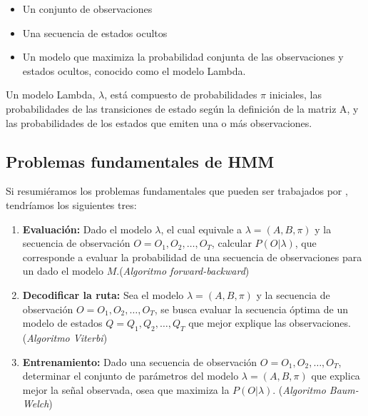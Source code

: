 \begin{itemize}
	\menorEspacioItemize
	\item Un conjunto de observaciones
	\item Una secuencia de estados ocultos
	\item Un modelo que maximiza la probabilidad conjunta de las observaciones y estados ocultos, conocido como el modelo Lambda.
\end{itemize}


Un modelo Lambda, $\lambda$, está compuesto de probabilidades $\pi$ iniciales, las probabilidades de las transiciones de estado según la definición de la matriz A, y las probabilidades de los estados que emiten una o más observaciones.








 
\uncm
\subsection{Problemas fundamentales de HMM}

Si resumiéramos los problemas fundamentales que pueden ser trabajados por \HMM, tendríamos los siguientes tres:

\begin{enumerate}
	\menorEspacioItemize
	\item \textbf{Evaluación:} Dado el modelo $\lambda$, el cual equivale a $\lambda=(A,B,\pi)$ y la secuencia de observación $O = O_1,O_2,\dots,O_{T}$, calcular $P( O | \lambda)$, que corresponde a evaluar la probabilidad de una secuencia de observaciones para un \HMM dado el modelo $M$.(\emph{Algoritmo forward-backward})


	\item \textbf{Decodificar la ruta:} Sea el modelo $\lambda=(A,B,\pi)$ y la secuencia de observación $O = O_1,O_2,\dots,O_{T}$, se busca evaluar  la secuencia óptima de un modelo de estados $Q = Q_1,Q_2,\dots,Q_{T}$ que mejor explique las observaciones. (\emph{Algoritmo Viterbi})


	\item  \textbf{Entrenamiento:} Dado una secuencia de observación $O = O_1,O_2,\dots,O_{T}$,  determinar el conjunto de parámetros del modelo $\lambda=(A,B,\pi)$ que explica mejor la señal observada, osea que maximiza la $P(O|\lambda)$. (\emph{Algoritmo Baum-Welch})

\end{enumerate}




